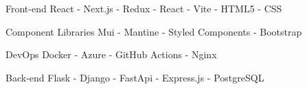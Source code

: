 

\begin{cvskills}
    
  \cvskill
    {Front-end} %
    {React - Next.js - Redux - React - Vite - HTML5 - CSS} %

\cvskill
  {Component Libraries} %
  {Mui - Mantine - Styled Components - Bootstrap} %
    
  \cvskill
    {DevOps} %
    {Docker - Azure - GitHub Actions - Nginx} %

  \cvskill
    {Back-end} %
    {Flask - Django - FastApi - Express.js -  PostgreSQL} %


\end{cvskills}
